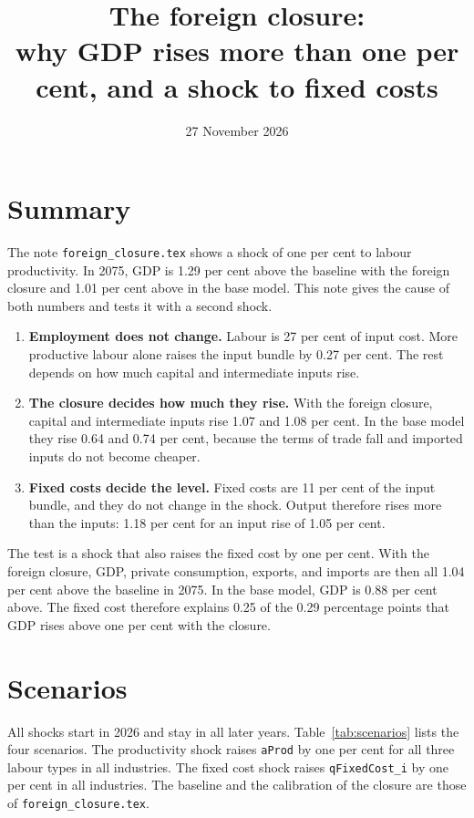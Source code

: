 \documentclass[11pt,a4paper]{article}
\title{The foreign closure:\\ why GDP rises more than one per cent, and a shock to fixed costs}
\author{}
\date{27 November 2026}
\newcommand{\code}[1]{\texttt{#1}}
\begin{document}
\maketitle

\section{Summary}

The note \code{foreign\_closure.tex} shows a shock of one per cent to labour productivity.
In 2075, GDP is 1.29 per cent above the baseline with the foreign closure and 1.01 per cent above in the base model.
This note gives the cause of both numbers and tests it with a second shock.

\begin{enumerate}
\item \textbf{Employment does not change.} Labour is 27 per cent of input cost. More productive labour alone raises the input bundle by 0.27 per cent. The rest depends on how much capital and intermediate inputs rise.
\item \textbf{The closure decides how much they rise.} With the foreign closure, capital and intermediate inputs rise 1.07 and 1.08 per cent. In the base model they rise 0.64 and 0.74 per cent, because the terms of trade fall and imported inputs do not become cheaper.
\item \textbf{Fixed costs decide the level.} Fixed costs are 11 per cent of the input bundle, and they do not change in the shock. Output therefore rises more than the inputs: 1.18 per cent for an input rise of 1.05 per cent.
\end{enumerate}

The test is a shock that also raises the fixed cost by one per cent.
With the foreign closure, GDP, private consumption, exports, and imports are then all 1.04 per cent above the baseline in 2075. In the base model, GDP is 0.88 per cent above.
The fixed cost therefore explains 0.25 of the 0.29 percentage points that GDP rises above one per cent with the closure.

\section{Scenarios}

All shocks start in 2026 and stay in all later years. Table~\ref{tab:scenarios} lists the four scenarios.
The productivity shock raises \code{aProd} by one per cent for all three labour types in all industries.
The fixed cost shock raises \code{qFixedCost\_i} by one per cent in all industries.
The baseline and the calibration of the closure are those of \code{foreign\_closure.tex}.
\end{document}
